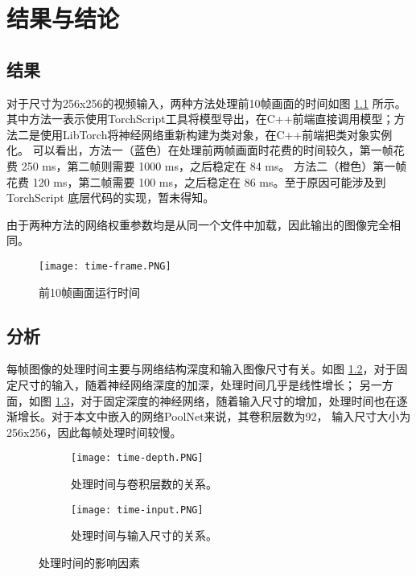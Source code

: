 
\chapter{结果与结论}

\section{结果}

对于尺寸为256x256的视频输入，两种方法处理前10帧画面的时间如图 \ref{fig:time-frame} 所示。
其中方法一表示使用TorchScript工具将模型导出，在C++前端直接调用模型；方法二是使用LibTorch将神经网络重新构建为类对象，在C++前端把类对象实例化。
可以看出，方法一（蓝色）在处理前两帧画面时花费的时间较久，第一帧花费 250 ms，第二帧则需要 1000 ms，之后稳定在 84 ms。
方法二（橙色）第一帧花费 120 ms，第二帧需要 100 ms，之后稳定在 86 ms。至于原因可能涉及到 TorchScript 底层代码的实现，暂未得知。

由于两种方法的网络权重参数均是从同一个文件中加载，因此输出的图像完全相同。

\begin{figure}[h]
\centering
\texttt{[image: time-frame.PNG]}
\caption{前10帧画面运行时间}
\label{fig:time-frame}
\end{figure}

\section{分析}

每帧图像的处理时间主要与网络结构深度和输入图像尺寸有关。如图 \ref{fig:time_a}，对于固定尺寸的输入，随着神经网络深度的加深，处理时间几乎是线性增长；
另一方面，如图 \ref{fig:time_b}，对于固定深度的神经网络，随着输入尺寸的增加，处理时间也在逐渐增长。对于本文中嵌入的网络PoolNet来说，其卷积层数为92，
输入尺寸大小为256x256，因此每帧处理时间较慢。

\begin{figure}[h]
    \centering
    \begin{subfigure}{.4\textwidth}
        \centering
        \texttt{[image: time-depth.PNG]}
        \caption{处理时间与卷积层数的关系。}
        \label{fig:time_a}
    \end{subfigure}
    \begin{subfigure}{.4\textwidth}
        \centering
        \texttt{[image: time-input.PNG]}
        \caption{处理时间与输入尺寸的关系。}
        \label{fig:time_b}
    \end{subfigure}
    \caption{处理时间的影响因素}
    \label{fig:time}
\end{figure}


